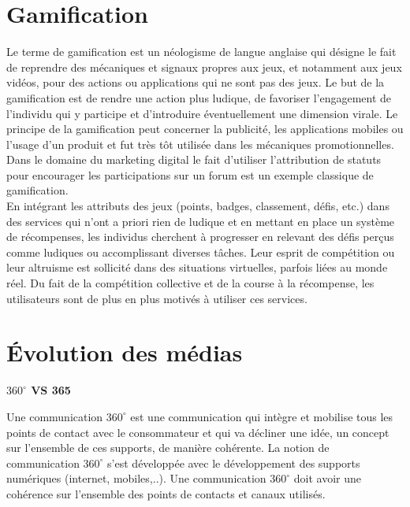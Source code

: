 \vspace{-1.2cm}

\section{Gamification}

Le terme de gamification est un néologisme de langue anglaise qui désigne le fait de reprendre des mécaniques et signaux propres aux jeux, et notamment aux jeux vidéos, pour des actions ou applications qui ne sont pas des jeux. Le but de la gamification est de rendre une action plus ludique, de favoriser l'engagement de l'individu qui y participe et d'introduire éventuellement une dimension virale. Le principe de la gamification peut concerner la publicité, les applications mobiles ou l'usage d'un produit et fut très tôt utilisée dans les mécaniques promotionnelles. Dans le domaine du marketing digital le fait d'utiliser l'attribution de statuts pour encourager les participations sur un forum est un exemple classique de gamification.\\

En intégrant les attributs des jeux (points, badges, classement, défis, etc.) dans des services qui n'ont a priori rien de ludique et en mettant en place un système de récompenses, les individus cherchent à progresser en relevant des défis perçus comme ludiques ou accomplissant diverses tâches. Leur esprit de compétition ou leur altruisme est sollicité dans des situations virtuelles, parfois
liées au monde réel. Du fait de la compétition collective et de la course à la récompense, les utilisateurs sont de plus en plus motivés à utiliser ces services.\\

\section{Évolution des médias}

\boldmath
\textbf{$360^{\circ}$ VS 365}\\
\unboldmath

Une communication $360^{\circ}$ est une communication qui intègre et mobilise tous les points de contact avec le consommateur et qui va décliner une idée, un concept sur l'ensemble de ces supports, de manière cohérente. La notion de communication $360^{\circ}$ s'est développée avec le développement des supports numériques (internet, mobiles,..). Une communication $360^{\circ}$ doit avoir une cohérence sur l'ensemble des points de contacts et canaux utilisés.\\

